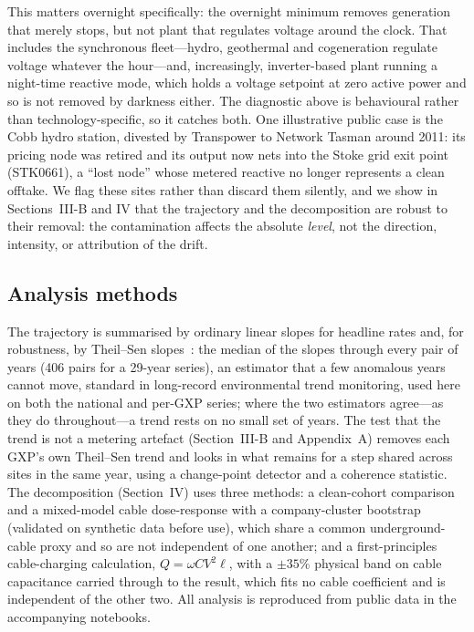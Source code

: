 \documentclass[journal]{IEEEtran}
\begin{document}
This matters overnight specifically: the overnight minimum removes generation
that merely stops, but not plant that regulates voltage around the clock. That
includes the synchronous fleet---hydro, geothermal and cogeneration regulate
voltage whatever the hour---and, increasingly, inverter-based plant running a
night-time reactive mode, which holds a voltage setpoint at zero active power
and so is not removed by darkness either. The diagnostic above is behavioural
rather than technology-specific, so it catches both. One
illustrative public case is the Cobb hydro station, divested by Transpower to
Network Tasman around 2011: its pricing node was retired and its output now nets
into the Stoke grid exit point (STK0661), a ``lost node'' whose metered reactive no
longer represents a clean offtake. We flag these sites rather than discard them
silently, and we show in Sections~III-B and IV that the trajectory and the
decomposition are robust to their removal: the contamination affects the absolute
\emph{level}, not the direction, intensity, or attribution of the drift.

\subsection{Analysis methods}
The trajectory is summarised by ordinary linear slopes for headline rates and, for
robustness, by Theil--Sen slopes~\cite{sen1968}: the median of the slopes through
every pair of years (406 pairs for a 29-year series), an estimator that a few
anomalous years cannot move, standard in long-record environmental trend
monitoring, used here on both the national and per-GXP series; where the two
estimators agree---as they do throughout---a trend rests on no small set of
years. The test that the trend is not a metering artefact
(Section~III-B and Appendix~A) removes each GXP's own Theil--Sen trend and looks in what remains for a step
shared across sites in the same year, using a change-point detector and a
coherence statistic. The decomposition (Section~IV) uses three methods: a
clean-cohort comparison and a mixed-model cable dose-response with a
company-cluster bootstrap (validated on synthetic data before use), which share a common
underground-cable proxy and so are not independent of one another; and a
first-principles cable-charging calculation, $Q=\omega C V^2 \ell$, with a $\pm
35\%$ physical band on cable capacitance carried through to the result, which fits
no cable coefficient and is independent of the other two. All analysis is
reproduced from public data in the accompanying notebooks.
\end{document}
